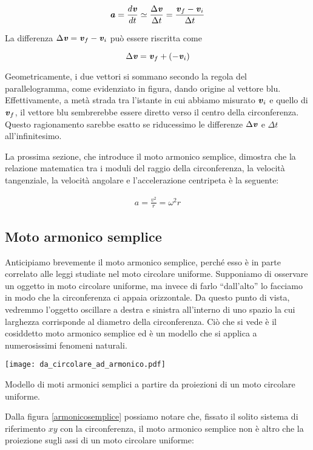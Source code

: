 \[ \textbf{\textit{a}} = \frac{d\textbf{\textit{v}}}{dt} \simeq \frac{\Delta \textbf{\textit{v}}}{\Delta t} = \frac{\textbf{\textit{v}}_f - \textbf{\textit{v}}_i}{\Delta t} \]

\noindent La differenza $\Delta \textbf{\textit{v}} = \textbf{\textit{v}}_f - \textbf{\textit{v}}_i$
può essere riscritta come

\[ \Delta \textbf{\textit{v}} = \textbf{\textit{v}}_f + (-\textbf{\textit{v}}_i) \]

\noindent Geometricamente, i due vettori si sommano secondo la
regola del parallelogramma, come evidenziato in figura, dando origine
al vettore blu. Effettivamente, a metà strada tra l'istante in cui
abbiamo misurato $\textbf{\textit{v}}_i$ e quello di $\textbf{\textit{v}}_f$, il
vettore blu sembrerebbe essere diretto verso il centro della circonferenza.
Questo ragionamento sarebbe esatto se riducessimo
le differenze $\Delta \textbf{\textit{v}}$ e $\Delta t$ all'infinitesimo.

La prossima sezione, che introduce il moto armonico semplice, dimostra
che la relazione matematica tra i moduli del raggio della circonferenza,
la velocità tangenziale, la velocità angolare e l'accelerazione centripeta
è la seguente:

\begin{align}
    a = \frac{v^2}{r} = \omega^2 r
\end{align}


\subsection{Moto armonico semplice}
Anticipiamo brevemente il moto armonico semplice, perché esso è in
parte correlato alle leggi studiate nel moto circolare uniforme.
Supponiamo di osservare un oggetto in moto circolare uniforme, ma
invece di farlo ``dall'alto'' lo facciamo in modo che la circonferenza
ci appaia orizzontale. Da questo punto di vista, vedremmo l'oggetto
oscillare a destra e sinistra all'interno di uno spazio la cui
larghezza corrisponde al diametro della circonferenza. Ciò che si
vede è il cosiddetto moto armonico semplice ed è un modello che si
applica a numerosissimi fenomeni naturali.

\begin{marginfigure}
    \centering
    \texttt{[image: da\_circolare\_ad\_armonico.pdf]}
    \caption{Modello di moti armonici semplici a partire da proiezioni
    di un moto circolare uniforme.}
    \label{armonicosemplice}
\end{marginfigure}

Dalla figura \ref{armonicosemplice} possiamo notare che, fissato il solito sistema di riferimento
$xy$ con la circonferenza, il moto armonico semplice non è altro che la
proiezione sugli assi di un moto circolare uniforme:

